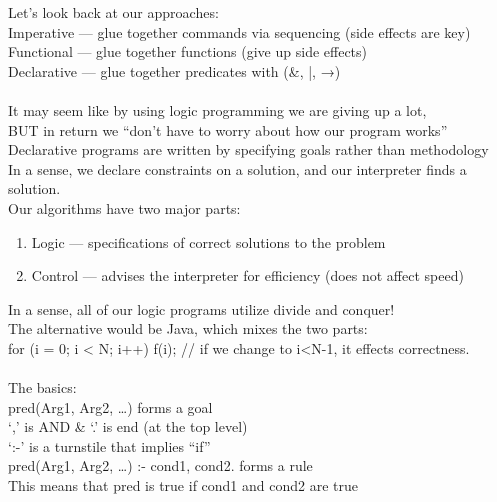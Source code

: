\documentclass[../../lecture_notes.tex]{subfiles}
\begin{document}
Let’s look back at our approaches:\\
\indent Imperative — glue together commands via sequencing (side effects are key)\\
\indent Functional — glue together functions (give up side effects)\\
\indent Declarative — glue together predicates with (\&, |, →)\\
\\
It may seem like by using logic programming we are giving up a lot,\\
\indent BUT in return we “don’t have to worry about how our program works”\\
Declarative programs are written by specifying goals rather than methodology\\
In a sense, we declare constraints on a solution, and our interpreter finds a solution.\\
Our algorithms have two major parts:
\begin{enumerate} [itemsep=0mm]
	\item Logic — specifications of correct solutions to the problem
	\item Control — advises the interpreter for efficiency (does not affect speed)
\end{enumerate}
\noindent In a sense, all of our logic programs utilize divide and conquer!\\
The alternative would be Java, which mixes the two parts:\\
	\indent for (i = 0; i < N; i++) f(i); // if we change to i<N-1, it effects correctness.\\
\\
The basics:\\
	\indent pred(Arg1, Arg2, …) forms a goal\\
	\indent ‘,’ is AND \& ‘.’ is end (at the top level)\\
	\indent ‘:-’ is a turnstile that implies “if”\\
	\indent pred(Arg1, Arg2, …) :- cond1, cond2. forms a rule\\
		\indent \indent This means that pred is true if cond1 and cond2 are true\\
\\ 
\end{document}
